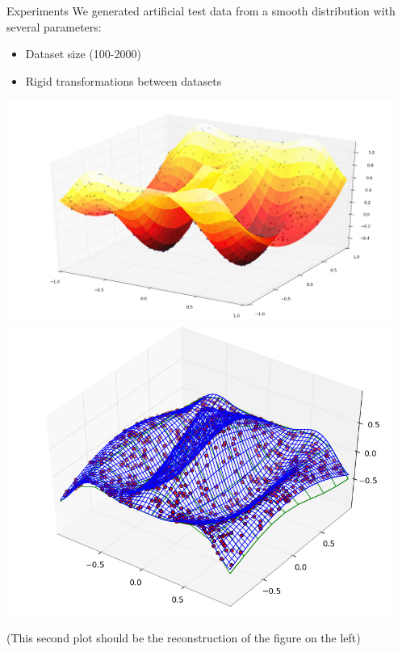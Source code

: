 \documentclass[final]{beamer}
\begin{document}
\begin{frame}{}
\begin{textblock}{27}
\begin{block}{Experiments}
We generated artificial test data from a smooth distribution with several parameters:
\begin{itemize}
\item Dataset size (100-2000)
\item Rigid transformations between datasets
\end{itemize}
\includegraphics[width=5in]{DistributionPlusPoints.png}
\includegraphics[width=5in]{Reconstruction.png}

(This second plot should be the reconstruction of the figure on the left)
\end{block}






\end{textblock}
\end{frame}
\end{document}
